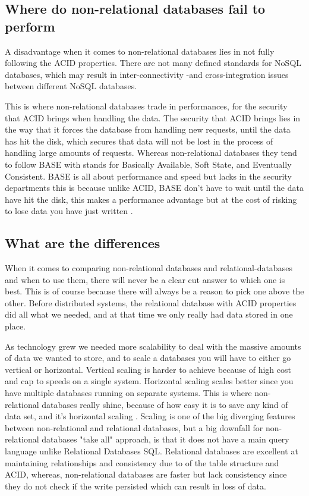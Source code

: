 \subsection{Where do non-relational databases fail to perform}
A disadvantage when it comes to non-relational databases lies in not fully following the ACID properties. There are not many defined standards for NoSQL databases, which may result in inter-connectivity -and cross-integration issues between different NoSQL databases. \parencite{loginradius-rdbms-vs-nosql}

This is where non-relational databases trade in performances, for the security that ACID brings when handling the data. The security that ACID brings lies in the way that it forces the database from handling new requests, until the data has hit the disk, which secures that data will not be lost in the process of handling large amounts of requests.
Whereas non-relational databases they tend to follow BASE with stands for Basically Available, Soft State, and Eventually Consistent. 
BASE is all about performance and speed but lacks in the security departments this is because unlike ACID, BASE don’t have to wait until the data have hit the disk, this makes a performance advantage but at the cost of risking to lose data you have just written  \parencite{neo4j-acid-vs-base} \parencite{dataversity-acid-vs-base}.

\subsection{What are the differences}
When it comes to comparing non-relational databases and relational-databases and when to use them, there will never be a clear cut answer to which one is best. This is of course because there will always be a reason to pick one above the other.
Before distributed systems, the relational database with ACID properties did all what we needed, and at that time we only really had data stored in one place.

As technology grew we needed more scalability to deal with the massive amounts of data we wanted to store, and to scale a databases you will have to either go vertical or horizontal.
Vertical scaling is harder to achieve because of high cost and cap to speeds on a single system. Horizontal scaling scales better since you have multiple databases running on separate systems. This is where non-relational databases really shine, because of how easy it is to save any kind of data set, and it’s horizontal scaling \parencite{investopedia-horizontal-vs-vertical-scaling}.
Scaling is one of the big diverging features between non-relational and relational databases, but a big downfall for non-relational databases "take all" approach, is that it does not have a main query language unlike Relational Databases SQL. 
Relational databases are excellent at maintaining relationships and consistency due to of the table structure and ACID, whereas, non-relational databases are faster but lack consistency since they do not check if the write persisted which can result in loss of data.
